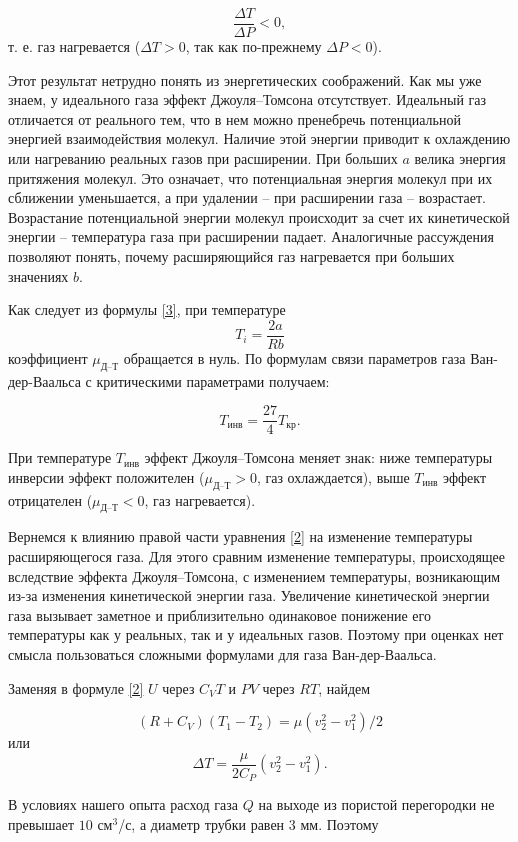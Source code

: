 \documentclass[a4paper, 12pt]{article}
\begin{document}
$$ \frac{\Delta T}{\Delta P} < 0, $$
т. е. газ нагревается ($ \Delta T > 0 $, так как по-прежнему $ \Delta P < 0 $).

Этот результат нетрудно понять из энергетических соображений. Как мы уже знаем, у идеального газа эффект Джоуля–Томсона отсутствует. Идеальный газ отличается от реального тем, что в нем можно пренебречь потенциальной энергией взаимодействия молекул. Наличие этой энергии приводит к охлаждению или нагреванию реальных газов при расширении. При больших $a$ велика энергия притяжения молекул. Это означает, что потенциальная энергия молекул при их сближении уменьшается, а при удалении -- при расширении газа -- возрастает. Возрастание потенциальной энергии молекул происходит за счет их кинетической энергии -- температура газа при расширении падает. Аналогичные рассуждения позволяют понять, почему расширяющийся газ нагревается при больших значениях $b$.

Как следует из формулы \eqref{3}, при температуре \[ T_i = \frac{2a}{Rb} \] коэффициент $ \mu_\text{Д--Т} $ обращается в нуль. По формулам связи параметров газа Ван-дер-Ваальса с критическими параметрами получаем: 

\begin{equation}\label{4}
	T_\text{инв} = \frac{27}{4} T_\text{кр}.
\end{equation}

При температуре $ T_\text{инв} $ эффект Джоуля–Томсона меняет знак: ниже температуры инверсии эффект положителен ($ \mu_\text{Д--Т} > 0 $, газ охлаждается), выше $ T_\text{инв} $ эффект отрицателен ($ \mu_\text{Д--Т} < 0 $, газ нагревается).

Вернемся к влиянию правой части уравнения \eqref{2} на изменение температуры расширяющегося газа. Для этого сравним изменение температуры, происходящее вследствие эффекта Джоуля–Томсона, с изменением температуры, возникающим из-за изменения кинетической энергии газа. Увеличение кинетической энергии газа вызывает заметное и приблизительно одинаковое понижение его температуры как у реальных, так и у идеальных газов. Поэтому при оценках нет смысла пользоваться сложными формулами для газа Ван-дер-Ваальса.

Заменяя в формуле \eqref{2} $ U $ через $ C_VT $ и $ PV $ через $ RT $, найдем

$$ \left(R+C_V\right)\left(T_1-T_2\right)=\mu\left(v_2^2-v_1^2\right)/2 $$
или
$$ \Delta T = \frac{\mu}{2C_P}\left(v_2^2-v_1^2\right). $$

В условиях нашего опыта расход газа $ Q  $ на выходе из пористой перегородки не превышает $ 10 $ см$ ^3 $/с, а диаметр трубки равен 3 мм. Поэтому
\end{document}
